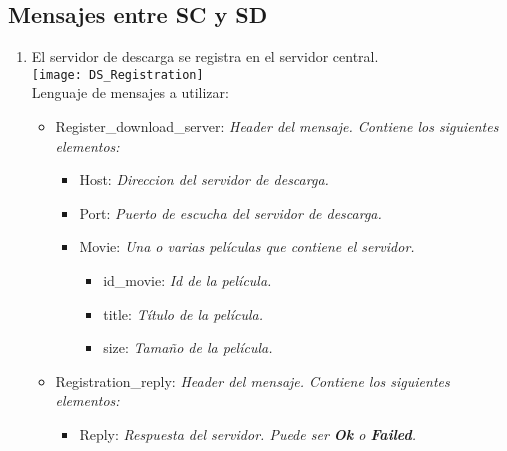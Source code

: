 \documentclass{article}
\begin{document}
\subsection*{Mensajes entre SC y SD}
\begin{enumerate}
\item El servidor de descarga se registra en el servidor central.\\[0.4cm]
    \texttt{[image: DS\_Registration]}\\[0.4cm]
    Lenguaje de mensajes a utilizar:
    \begin{itemize}
        \item Register\_download\_server:    \emph{Header del mensaje. Contiene los siguientes elementos:}
        \begin{itemize}
            \item Host:    \emph{Direccion del servidor de descarga.}
            \item Port:    \emph{Puerto de escucha del servidor de descarga.}
            \item Movie:    \emph{Una o varias películas que contiene el servidor.}
            \begin{itemize}
                \item id\_movie:    \emph{Id de la película.}
                \item title:    \emph{Título de la película.}
                \item size:    \emph{Tamaño de la película.}
            \end{itemize}
        \end{itemize}
        \item Registration\_reply:    \emph{Header del mensaje. Contiene los siguientes elementos:}
        \begin{itemize}
            \item Reply:    \emph{Respuesta del servidor. Puede ser \textbf{Ok} o \textbf{Failed}.}
        \end{itemize}
    \end{itemize}
\end{enumerate}
\clearpage
\end{document}

